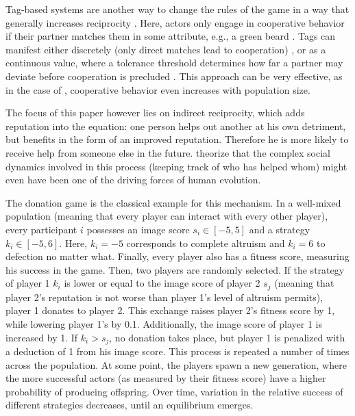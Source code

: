 \documentclass{JASSS}
\begin{document}
Tag-based systems are another way to change the rules of the game in a way that generally increases reciprocity \citep{Hamilton1964,Axelrod2004,Spector2006, Cohen2012, Shutters2013}. Here, actors only engage in cooperative behavior if their partner matches them in some attribute, e.g., a green beard \citep{Dawkins1976}. Tags can manifest either discretely (only direct matches lead to cooperation) \citep{Axelrod2004}, or as a continuous value, where a tolerance threshold determines how far a partner may deviate before cooperation is precluded \citep{Shutters2013, Shutters2015}. This approach can be very effective, as in the case of \cite{Shutters2015}, cooperative behavior even increases with population size.

The focus of this paper however lies on indirect reciprocity, which adds reputation into the equation: one person helps out another at his own detriment, but benefits in the form of an improved reputation. Therefore he is more likely to receive help from someone else in the future. \cite{Nowak1998} theorize that the complex social dynamics involved in this process (keeping track of who has helped whom) might even have been one of the driving forces of human evolution.

The donation game is the classical example for this mechanism. In a well-mixed population (meaning that every player can interact with every other player), every participant $i$ possesses an image score $s_i \in [-5,5]$ and a strategy $k_i \in [-5,6]$. Here, $k_i=-5$ corresponds to complete altruism and $k_i=6$ to defection no matter what. Finally, every player also has a fitness score, measuring his success in the game. Then, two players are randomly selected. If the strategy of player 1 $k_i$ is lower or equal to the image score of player 2 $s_j$ (meaning that player 2's reputation is not worse than player 1's level of altruism permits), player 1 donates to player 2. This exchange raises player 2's fitness score by 1, while lowering player 1's by 0.1. Additionally, the image score of player 1 is increased by 1. If $k_i>s_j$, no donation takes place, but player 1 is penalized with a deduction of 1 from his image score. This process is repeated a number of times across the population. At some point, the players spawn a new generation, where the more successful actors (as measured by their fitness score) have a higher probability of producing offspring. Over time, variation in the relative success of different strategies decreases, until an equilibrium emerges.
\end{document}
